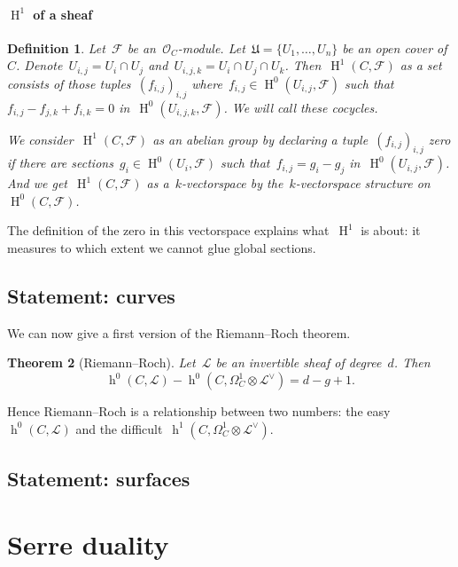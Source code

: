 \documentclass[10pt,a4paper]{article}
\theoremstyle{lecture}
\newtheorem{theorem}{Theorem}
\newtheorem{definition}[theorem]{Definition}
\newcommand\dash{\nobreakdash-\hspace{0pt}}
\DeclareMathOperator\hh{h}
\DeclareMathOperator\HH{H}
\begin{document}
\paragraph{$\HH^1$ of a sheaf}
\begin{definition}
  Let~$\mathcal{F}$ be an~$\mathcal{O}_C$\dash module. Let~$\mathfrak{U}=\{U_1,\dotsc,U_n\}$ be an open cover of~$C$. Denote~$U_{i,j}=U_i\cap U_j$ and~$U_{i,j,k}=U_i\cap U_j\cap U_k$. Then~$\HH^1(C,\mathcal{F})$ \emph{as a set} consists of those tuples~$(f_{i,j})_{i,j}$ where~$f_{i,j}\in\HH^0(U_{i,j},\mathcal{F})$ such that~$f_{i,j}-f_{j,k}+f_{i,k}=0$ in~$\HH^0(U_{i,j,k},\mathcal{F})$. We will call these \emph{cocycles}.

  We consider~$\HH^1(C,\mathcal{F})$ \emph{as an abelian group} by declaring a tuple~$(f_{i,j})_{i,j}$ zero if there are sections~$g_i\in\HH^0(U_i,\mathcal{F})$ such that~$f_{i,j}=g_i-g_j$ in~$\HH^0(U_{i,j},\mathcal{F})$. And we get~$\HH^1(C,\mathcal{F})$ \emph{as a~$k$\dash vectorspace} by the~$k$\dash vectorspace structure on~$\HH^0(C,\mathcal{F})$.
\end{definition}
The definition of the zero in this vectorspace explains what~$\HH^1$ is about: it measures to which extent we cannot glue global sections.

\subsection{Statement: curves}
\label{subsection:statement-curves}
We can now give a first version of the Riemann--Roch theorem.
\begin{theorem}[Riemann--Roch]
  \label{theorem:riemann-roch}
  Let~$\mathcal{L}$ be an invertible sheaf of degree~$d$. Then
  \begin{equation}
    \hh^0(C,\mathcal{L})-\hh^0(C,\Omega_C^1\otimes\mathcal{L}^\vee)=d-g+1.
  \end{equation}
\end{theorem}
Hence Riemann--Roch is a relationship between two numbers: the easy~$\hh^0(C,\mathcal{L})$ and the difficult~$\hh^1(C,\Omega_C^1\otimes\mathcal{L}^\vee)$.


\subsection{Statement: surfaces}
\label{subsection:statement-surfaces}


\section{Serre duality}
\label{section:serre-duality}
\end{document}

